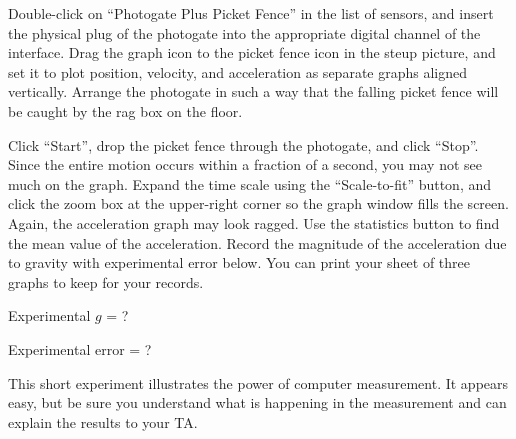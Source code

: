 \documentclass{article}
\begin{document}

Double-click on ``Photogate Plus Picket Fence'' in the list of sensors, and insert the physical plug of the photogate into the appropriate digital channel of the interface.  Drag the graph icon to the picket fence icon in the steup picture, and set it to plot position, velocity, and acceleration as separate graphs aligned vertically.  Arrange the photogate in such a way that the falling picket fence will be caught by the rag box on the floor.

Click ``Start'', drop the picket fence through the photogate, and click ``Stop''.  Since the entire motion occurs within a fraction of a second, you may not see much on the graph.  Expand the time scale using the ``Scale-to-fit'' button, and click the zoom box at the upper-right corner so the graph window fills the screen.  Again, the acceleration graph may look ragged.  Use the statistics button to find the mean value of the acceleration.  Record the magnitude of the acceleration due to gravity with experimental error below.  You can print your sheet of three graphs to keep for your records.

Experimental \(g\) = ?

Experimental error = ?

This short experiment illustrates the power of computer measurement.  It appears easy, but be sure you understand what is happening in the measurement and can explain the results to your TA.
\end{document}
